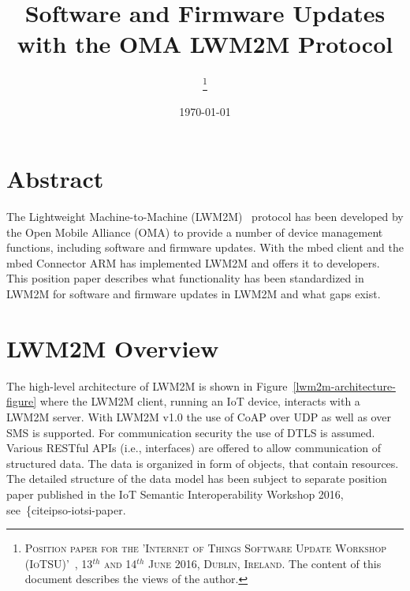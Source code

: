 \documentclass[peerreview, a4paper, 7pt]{IEEEtran}
\begin{document}
\title{Software and Firmware Updates with the OMA LWM2M Protocol}

\author{
\thanks{\textsc{Position paper for the 'Internet of Things Software Update Workshop (IoTSU)'~\cite{IOTSU}, 13$^{th}$ and 14$^{th}$ June 2016, Dublin, Ireland.} The content of this document describes the views of the author.}
}

\date{\today}

\maketitle


\section{Abstract}


The Lightweight Machine-to-Machine (LWM2M)~\cite{lwm2m} protocol has been developed by the Open Mobile Alliance (OMA) to provide a number of device management functions, including software and firmware updates. With the mbed client and the mbed Connector ARM has implemented LWM2M and offers it to developers. This position paper describes what functionality has been standardized in LWM2M for software and firmware updates in LWM2M and what gaps exist. 

\section{LWM2M Overview}
\label{lwm2m}

The high-level architecture of LWM2M is shown in Figure~\ref{lwm2m-architecture-figure} where the LWM2M client, running an IoT device, interacts with a LWM2M server. With LWM2M v1.0 the use of CoAP over UDP as well as over SMS is supported. For communication security the use of DTLS is assumed. Various RESTful APIs (i.e., interfaces) are offered to allow communication of structured data. The data is organized in form of objects, that contain resources. The detailed structure of the data model has been subject to separate position paper published in the IoT Semantic Interoperability Workshop 2016, see~\{cite{ipso-iotsi-paper}. 
\end{document}
